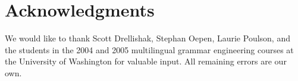 \documentclass[11pt]{article}
\begin{document}
\section*{Acknowledgments}

We would like to thank Scott Drellishak, Stephan Oepen, Laurie Poulson, 
and the students in the 2004 and 2005 multilingual grammar engineering
courses at the University of Washington for valuable input.  All
remaining errors are our own.


     
\end{document}
